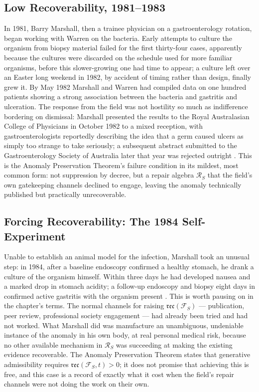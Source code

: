 \documentclass[12pt,twoside,openright]{book}
\newcommand{\reco}{\mathfrak{rec}}
\begin{document}
\subsection{Low Recoverability, 1981--1983}

In 1981, Barry Marshall, then a trainee physician on a
gastroenterology rotation, began working with Warren on the
bacteria. Early attempts to culture the organism from biopsy
material failed for the first thirty-four cases, apparently
because the cultures were discarded on the schedule used for more
familiar organisms, before this slower-growing one had time to
appear; a culture left over an Easter long weekend in 1982, by
accident of timing rather than design, finally grew it. By May
1982 Marshall and Warren had compiled data on one hundred
patients showing a strong association between the bacteria and
gastritis and ulceration. The response from the field was not
hostility so much as indifference bordering on dismissal: Marshall
presented the results to the Royal Australasian College of
Physicians in October 1982 to a mixed reception, with
gastroenterologists reportedly describing the idea that a germ
caused ulcers as simply too strange to take seriously; a
subsequent abstract submitted to the Gastroenterology Society of
Australia later that year was rejected outright
\parencite{kyle2016}. This is the
Anomaly Preservation Theorem's failure condition in its mildest,
most common form: not suppression by decree, but a repair
algebra $\mathcal{R}_S$ that the field's own gatekeeping channels
declined to engage, leaving the anomaly technically published but
practically unrecoverable.

\subsection{Forcing Recoverability: The 1984 Self-Experiment}

Unable to establish an animal model for the infection, Marshall
took an unusual step: in 1984, after a baseline endoscopy
confirmed a healthy stomach, he drank a culture of the organism
himself. Within three days he had developed nausea and a marked
drop in stomach acidity; a follow-up endoscopy and biopsy eight
days in confirmed active gastritis with the organism present
\parencite{marshall1985,marshall1984}.
This is worth pausing on in the chapter's terms. The normal
channels for raising $\reco(\mathcal{F}_S)$ --- publication, peer
review, professional society engagement --- had already been
tried and had not worked. What Marshall did was manufacture an
unambiguous, undeniable instance of the anomaly in his own body,
at real personal medical risk, because no other available
mechanism in $\mathcal{R}_S$ was succeeding at making the existing
evidence recoverable. The Anomaly Preservation Theorem states that
generative admissibility requires $\reco(\mathcal{F}_S, t) > 0$;
it does not promise that achieving this is free, and this case is
a record of exactly what it cost when the field's repair channels
were not doing the work on their own.
\end{document}
